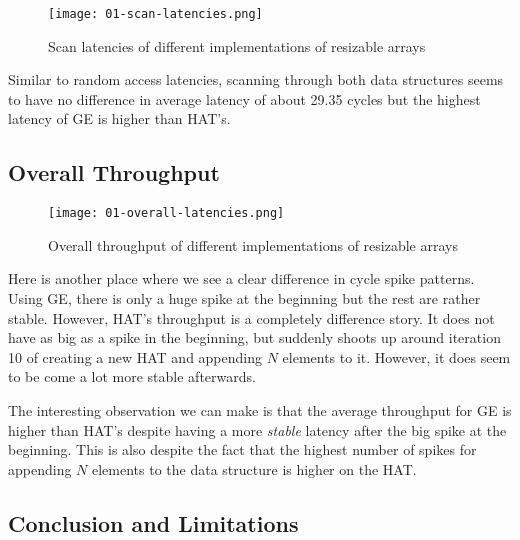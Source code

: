\begin{figure}[H]
	\begin{center}
		\texttt{[image: 01-scan-latencies.png]}
		\caption{Scan latencies of different implementations of resizable arrays}
		\label{fig:scan-throughput}
	\end{center}
\end{figure}

Similar to random access latencies, scanning through both data structures seems to have no difference in average latency of about 29.35 cycles but the highest latency of GE is higher than HAT's.

\endgroup

\begingroup

\subsection{Overall Throughput}

\begin{figure}[H]
	\begin{center}
		\texttt{[image: 01-overall-latencies.png]}
		\caption{Overall throughput of different implementations of resizable arrays}
		\label{fig:overall-throughput}
	\end{center}
\end{figure}

Here is another place where we see a clear difference in cycle spike patterns. Using GE, there is only a huge spike at the beginning but the rest are rather stable. However, HAT's throughput is a completely difference story. It does not have as big as a spike in the beginning, but suddenly shoots up around iteration 10 of creating a new HAT and appending $N$ elements to it. However, it does seem to be come a lot more stable afterwards.

The interesting observation we can make is that the average throughput for GE is higher than HAT's despite having a more \textit{stable} latency after the big spike at the beginning. This is also despite the fact that the highest number of spikes for appending $N$ elements to the data structure is higher on the HAT.

\endgroup

\begingroup

\subsection{Conclusion and Limitations}

